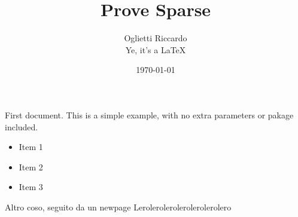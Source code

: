\documentclass{report}
\author{Oglietti Riccardo \\ Ye, it's a \LaTeX{}}
\title{Prove Sparse}
\date{\today}
\begin{document}
    \maketitle
    First document. This is a simple example, with no extra
    parameters or pakage included.
    \begin{itemize}
        \item Item 1
        \item Item 2
        \item Item 3
    \end{itemize}
    Altro coso, seguito da un newpage
    \newpage
    Lerolerolerolerolerolerolero
\end{document}
